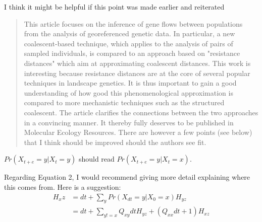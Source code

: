 \begin{point}{\revref}
    I think it  might be helpful if this point was made earlier and reiterated
\end{point}




\begin{quote}
    This article focuses on the inference of gene flows between populations from
    the analysis of georeferenced genetic data. In particular, a new
    coalescent-based technique, which applies to the analysis of pairs of
    sampled individuals, is compared to an approach based on "resistance
    distances" which aim at approximating coalescent distances. This work is
    interesting because resistance distances are at the core of several popular
    techniques in landscape genetics. It is thus important to gain a good
    understanding of how good this phenomenological approximation is compared
    to more mechanistic techniques such as the structured coalescent. The
    article clarifies the connections between the two approaches in a
    convincing manner. It thereby fully deserves to be published in Molecular
    Ecology Resources. There are however a few points (see below) that I think
    should be improved should the authors see fit.
\end{quote}



\begin{point}{}
    $Pr(X_{t+e}=y | X_t=y)$ should read $Pr(X_{t+e}=y | X_t=x)$.
\end{point}

\reply{
}

\begin{point}{}
    Regarding Equation 2, I would recommend giving more detail explaining where
    this comes from. Here is a suggestion:
    \begin{align*}
        H_xz &= dt + \sum_y Pr(X_{dt} = y | X_0 = x) H_{yz} \\
             &= dt + \sum_{y != x} Q_{xy} dt H_{yz} + (Q_{xx} dt + 1) H_{xz}
    \end{align*}
\end{point}

\reply{
}

